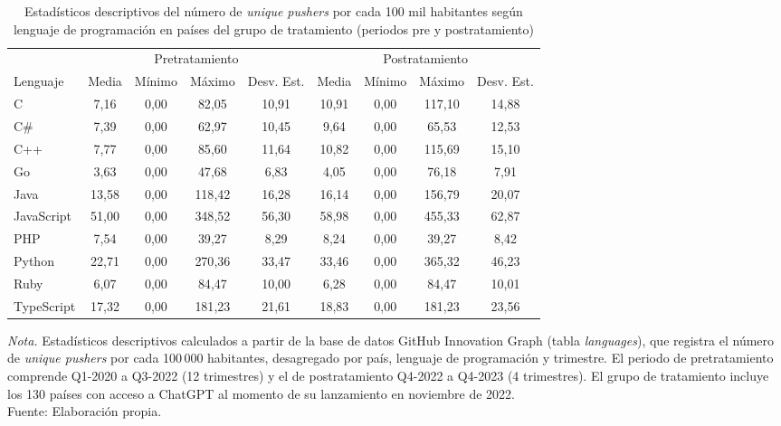 \documentclass[12pt,a4paper]{article}
\begin{document}
\begin{table}[H]
\centering
\caption{Estadísticos descriptivos del número de \textit{unique pushers} por cada 100 mil habitantes según lenguaje de programación en países del grupo de tratamiento (periodos pre y postratamiento)}
\label{tab:tabla2}
\setlength{\tabcolsep}{3pt}\begin{tabular}{lcccccccc}
\toprule
 & \multicolumn{4}{c}{Pretratamiento} & \multicolumn{4}{c}{Postratamiento} \\
\cmidrule(lr){2-5}\cmidrule(lr){6-9}
Lenguaje & Media & Mínimo & Máximo & Desv. Est. & Media & Mínimo & Máximo & Desv. Est. \\
\midrule
C          &  7{,}16 & 0{,}00 &  82{,}05 & 10{,}91 & 10{,}91 & 0{,}00 & 117{,}10 & 14{,}88 \\
C\#        &  7{,}39 & 0{,}00 &  62{,}97 & 10{,}45 &  9{,}64 & 0{,}00 &  65{,}53 & 12{,}53 \\
C++        &  7{,}77 & 0{,}00 &  85{,}60 & 11{,}64 & 10{,}82 & 0{,}00 & 115{,}69 & 15{,}10 \\
Go         &  3{,}63 & 0{,}00 &  47{,}68 &  6{,}83 &  4{,}05 & 0{,}00 &  76{,}18 &  7{,}91 \\
Java       & 13{,}58 & 0{,}00 & 118{,}42 & 16{,}28 & 16{,}14 & 0{,}00 & 156{,}79 & 20{,}07 \\
JavaScript & 51{,}00 & 0{,}00 & 348{,}52 & 56{,}30 & 58{,}98 & 0{,}00 & 455{,}33 & 62{,}87 \\
PHP        &  7{,}54 & 0{,}00 &  39{,}27 &  8{,}29 &  8{,}24 & 0{,}00 &  39{,}27 &  8{,}42 \\
Python     & 22{,}71 & 0{,}00 & 270{,}36 & 33{,}47 & 33{,}46 & 0{,}00 & 365{,}32 & 46{,}23 \\
Ruby       &  6{,}07 & 0{,}00 &  84{,}47 & 10{,}00 &  6{,}28 & 0{,}00 &  84{,}47 & 10{,}01 \\
TypeScript & 17{,}32 & 0{,}00 & 181{,}23 & 21{,}61 & 18{,}83 & 0{,}00 & 181{,}23 & 23{,}56 \\
\bottomrule
\end{tabular}
\begin{minipage}{\linewidth}
\smallskip\footnotesize\textit{Nota.} Estadísticos descriptivos calculados a partir de la base de datos GitHub Innovation Graph (tabla \textit{languages}), que registra el número de \textit{unique pushers} por cada 100\,000 habitantes, desagregado por país, lenguaje de programación y trimestre. El periodo de pretratamiento comprende Q1-2020 a Q3-2022 (12 trimestres) y el de postratamiento Q4-2022 a Q4-2023 (4 trimestres). El grupo de tratamiento incluye los 130 países con acceso a ChatGPT al momento de su lanzamiento en noviembre de 2022.\\[\baselineskip]Fuente: Elaboración propia.
\end{minipage}
\end{table}
\end{document}
